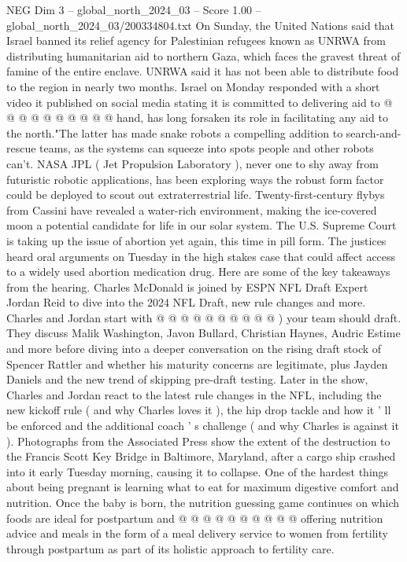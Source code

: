 \begin{textsample}{NEG Dim 3 – global\_north\_2024\_03 – Score 1.00 – global\_north\_2024\_03/200334804.txt}
On Sunday, the United Nations said that Israel banned its relief agency for Palestinian refugees known as UNRWA from distributing humanitarian aid to northern Gaza, which faces the gravest threat of famine of the entire enclave.
UNRWA said it has not been able to distribute food to the region in nearly two months.
Israel on Monday responded with a short video it published on social media stating it is committed to delivering aid to @ @ @ @ @ @ @ @ @ @ hand, has long forsaken its role in facilitating any aid to the north."The latter has made snake robots a compelling addition to search-and-rescue teams, as the systems can squeeze into spots people and other robots can't.
NASA JPL ( Jet Propulsion Laboratory ), never one to shy away from futuristic robotic applications, has been exploring ways the robust form factor could be deployed to scout out extraterrestrial life.
Twenty-first-century flybys from Cassini have revealed a water-rich environment, making the ice-covered moon a potential candidate for life in our solar system.
The U.S.
Supreme Court is taking up the issue of abortion yet again, this time in pill form.
The justices heard oral arguments on Tuesday in the high stakes case that could affect access to a widely used abortion medication drug.
Here are some of the key takeaways from the hearing.
Charles McDonald is joined by ESPN NFL Draft Expert Jordan Reid to dive into the 2024 NFL Draft, new rule changes and more.
Charles and Jordan start with @ @ @ @ @ @ @ @ @ @ ) your team should draft.
They discuss Malik Washington, Javon Bullard, Christian Haynes, Audric Estime and more before diving into a deeper conversation on the rising draft stock of Spencer Rattler and whether his maturity concerns are legitimate, plus Jayden Daniels and the new trend of skipping pre-draft testing.
Later in the show, Charles and Jordan react to the latest rule changes in the NFL, including the new kickoff rule ( and why Charles loves it ), the hip drop tackle and how it ' ll be enforced and the additional coach ' s challenge ( and why Charles is against it ).
Photographs from the Associated Press show the extent of the destruction to the Francis Scott Key Bridge in Baltimore, Maryland, after a cargo ship crashed into it early Tuesday morning, causing it to collapse.
One of the hardest things about being pregnant is learning what to eat for maximum digestive comfort and nutrition.
Once the baby is born, the nutrition guessing game continues on which foods are ideal for postpartum and @ @ @ @ @ @ @ @ @ @ offering nutrition advice and meals in the form of a meal delivery service to women from fertility through postpartum as part of its holistic approach to fertility care.

\end{textsample}
